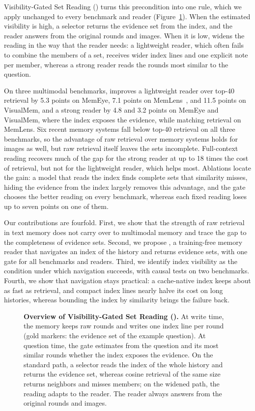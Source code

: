 Visibility-Gated Set Reading (\vgs{}) turns this precondition into one rule, which we apply unchanged to every benchmark and reader (Figure~\ref{fig:overview}). When the estimated visibility is high, a selector returns the evidence set from the index, and the reader answers from the original rounds and images. When it is low, \vgs{} widens the reading in the way that the reader needs: a lightweight reader, which often fails to combine the members of a set, receives wider index lines and one explicit note per member, whereas a strong reader reads the rounds most similar to the question.

On three multimodal benchmarks, \vgs{} improves a lightweight reader over top-40 retrieval by 5.3 points on MemEye, 7.1 points on MemLens~\citep{ren2026memlens}, and 11.5 points on VisualMem, and a strong reader by 4.8 and 3.2 points on MemEye and VisualMem, where the index exposes the evidence, while matching retrieval on MemLens. Six recent memory systems fall below top-40 retrieval on all three benchmarks, so the advantage of raw retrieval over memory systems holds for images as well, but raw retrieval itself leaves the sets incomplete. Full-context reading recovers much of the gap for the strong reader at up to 18 times the cost of retrieval, but not for the lightweight reader, which \vgs{} helps most. Ablations locate the gain: a model that reads the index finds complete sets that similarity misses, hiding the evidence from the index largely removes this advantage, and the gate chooses the better reading on every benchmark, whereas each fixed reading loses up to seven points on one of them.

Our contributions are fourfold. First, we show that the strength of raw retrieval in text memory does not carry over to multimodal memory and trace the gap to the completeness of evidence sets. Second, we propose \vgs{}, a training-free memory reader that navigates an index of the history and returns evidence sets, with one gate for all benchmarks and readers. Third, we identify index visibility as the condition under which navigation succeeds, with causal tests on two benchmarks. Fourth, we show that navigation stays practical: a cache-native index keeps \vgs{} about as fast as retrieval, and compact index lines nearly halve its cost on long histories, whereas bounding the index by similarity brings the failure back.

\begin{figure}[t]
\centering
\resizebox{\textwidth}{!}{}
\caption{\textbf{Overview of Visibility-Gated Set Reading (\vgs{}).} At write time, the memory keeps raw rounds and writes one index line per round (gold markers: the evidence set of the example question). At question time, the gate estimates from the question and its most similar rounds whether the index exposes the evidence. On the standard path, a selector reads the index of the whole history and returns the evidence set, whereas cosine retrieval of the same size returns neighbors and misses members; on the widened path, the reading adapts to the reader. The reader always answers from the original rounds and images.}
\label{fig:overview}
\end{figure}
